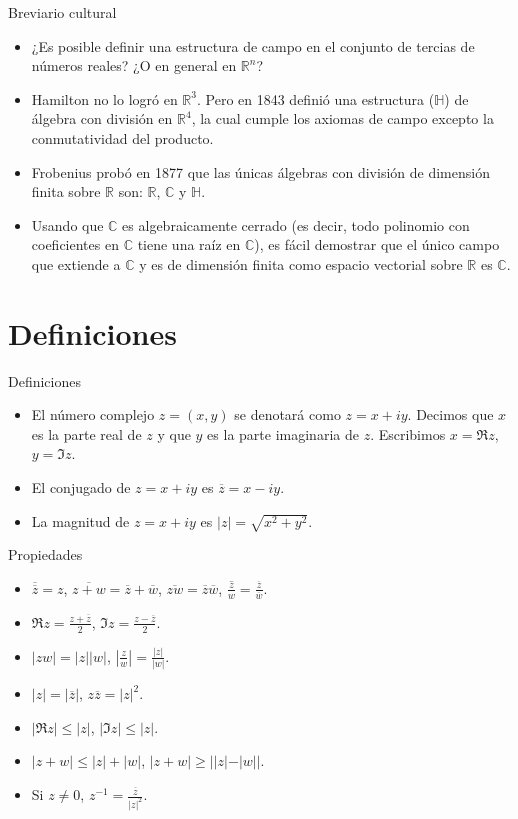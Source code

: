 \documentclass[spanish,presentation]{beamer}
\begin{document}
\begin{frame}[label=sec-3-3]{Breviario cultural}
\begin{itemize}
\item ¿Es posible definir una estructura de campo en el conjunto de
tercias de números reales? ¿O en general en \(\mathbb{R}^{n}\)?
\item Hamilton no lo logró en \(\mathbb{R}^{3}\). Pero en 1843 definió
una estructura (\(\mathbb{H}\)) de \alert{álgebra con división} en
\(\mathbb{R}^{4}\), la cual cumple los axiomas de campo excepto
la conmutatividad del producto.
\item Frobenius probó en 1877 que las únicas álgebras con división de
dimensión finita sobre \(\mathbb{R}\) son: \(\mathbb{R}\),
\(\mathbb{C}\) y \(\mathbb{H}\).
\item Usando que \(\mathbb{C}\) es \alert{algebraicamente cerrado} (es decir,
todo polinomio con coeficientes en \(\mathbb{C}\) tiene una raíz
en \(\mathbb{C}\)), es fácil demostrar que el único campo que
extiende a \(\mathbb{C}\) y es de dimensión finita como espacio
vectorial sobre \(\mathbb{R}\) es \(\mathbb{C}\).
\end{itemize}
\end{frame}
\section{Definiciones}
\label{sec-4}

\begin{frame}[label=sec-4-1]{Definiciones}
\begin{itemize}
\item El número complejo \(z=(x,y)\) se denotará como \(z=x+iy\). Decimos
que \(x\) es la \alert{parte real} de \(z\) y que \(y\) es la \alert{parte
imaginaria} de \(z\). Escribimos \(x=\Re z\), \(y=\Im z\).
\item El \alert{conjugado} de \(z=x+iy\) es \(\overline{z}=x-iy\).
\item La \alert{magnitud} de \(z=x+iy\) es \(|z|=\sqrt{x^{2}+y^{2}}\).
\end{itemize}
\end{frame}

\begin{frame}[label=sec-4-2]{Propiedades}
\begin{itemize}
\item \(\overline{\overline{z}}=z\),
\(\overline{z+w}=\overline{z}+\overline{w}\),
\(\overline{zw}=\overline{z}\overline{w}\),
\(\overline{\frac{z}{w}}=\frac{\overline{z}}{\overline{w}}\).
\item \(\Re z =\frac{z+\overline{z}}{2}\), \(\Im z =\frac{z-\overline{z}}{2}\).
\item \(|zw|=|z||w|\), \(|\frac{z}{w}|=\frac{|z|}{|w|}\).
\item \(|z|=|\overline{z}|\), \(z\overline{z}=|z|^{2}\).
\item \(|\Re z|\leq |z|\), \(|\Im z|\leq |z|\).
\item \(|z+w|\leq |z|+|w|\), \(|z+w|\geq ||z|-|w||\).
\item Si \(z\ne 0\), \(z^{-1}=\frac{\overline{z}}{|z|^{2}}\).
\end{itemize}
\end{frame}
\end{document}
